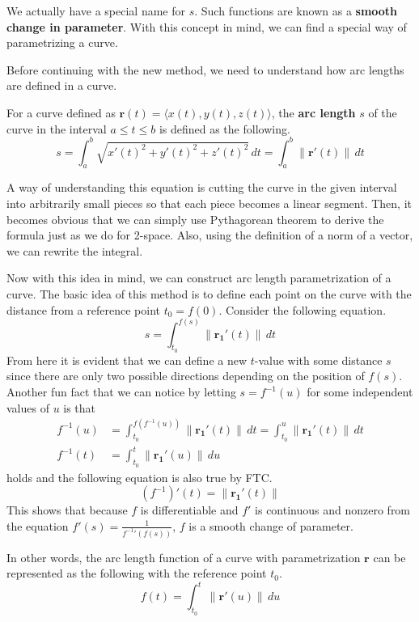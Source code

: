 \documentclass[../../../main.tex]{subfiles}
\begin{document}
We actually have a special name for $s$. Such functions are known
as a \textbf{smooth change in parameter}. With this concept in mind,
we can find a special way of parametrizing a curve.

Before continuing with the new method, we need to understand how
arc lengths are defined in a curve.

\begin{important}
For a curve defined as $\mathbf{r}(t) = \langle x(t), y(t), z(t)
\rangle$, the \textbf{arc length} $s$ of the curve in the interval
$a \leq t \leq b$ is defined as the following.
\[
s
= \int_a^b \sqrt{x'(t)^2 + y'(t)^2 + z'(t)^2} \,dt
= \int_a^b \| \mathbf{r}'(t) \| \,dt
\]
\end{important}

A way of understanding this equation is cutting the curve in the
given interval into arbitrarily small pieces so that each piece
becomes a linear segment. Then, it becomes obvious that we can
simply use Pythagorean theorem to derive the formula just as we do
for 2-space. Also, using the definition of a norm of a vector,
we can rewrite the integral.

Now with this idea in mind, we can construct arc length
parametrization of a curve. The basic idea of this method is to
define each point on the curve with the distance from a reference
point $t_0 = f(0)$. Consider the following equation.
\[
s = \int_{t_0}^{f(s)} \| \mathbf{r_1}'(t) \| \,dt
\]
From here it is evident that we can define a new $t$-value with some
distance $s$ since there are only two possible directions depending
on the position of $f(s)$. Another fun fact that we can notice by
letting $s = f^{-1}(u)$ for some independent values of $u$ is that
\begin{align*}
    f^{-1}(u)
    &= \int_{t_0}^{f(f^{-1} (u))} \| \mathbf{r_1}'(t) \| \,dt
    = \int_{t_0}^u \| \mathbf{r_1}'(t) \| \,dt \\
    f^{-1}(t)
    &= \int_{t_0}^t \| \mathbf{r_1}'(u) \| \,du
\end{align*}
holds and the following equation is also true by FTC.
\[
\left( f^{-1} \right)'(t) = \| \mathbf{r_1}'(t) \|
\]
This shows that because $f$ is differentiable and $f'$ is continuous
and nonzero from the equation $f'(s) = \frac{1}{{f^{-1}}'(f(s))}$,
$f$ is a smooth change of parameter.

\begin{important}
In other words, the arc length function of a curve with
parametrization $\mathbf{r}$ can be represented as the following
with the reference point $t_0$.
\[
f(t) = \int_{t_0}^t \| \mathbf{r}'(u) \| \,du
\]
\end{important}
\end{document}
